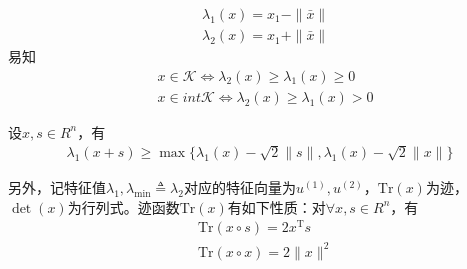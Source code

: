          \begin{align*}
        & {\lambda}_{1}(x)=x_1-\|\bar{x}\|\\
        & {\lambda}_{2}(x)=x_1+\|\bar{x}\|
        \end{align*}
        易知
         \begin{align*}
        & x \in \mathcal{K} \Leftrightarrow {\lambda}_{2}(x)\geqslant  {\lambda}_{1}(x)\geqslant 0\\
        & x \in int{}\mathcal{K} \Leftrightarrow {\lambda}_{2}(x)\geqslant {\lambda}_{1}(x) > 0
        \end{align*}
        \begin{lemma}
        设$x,s \in R^n$，有
         \begin{align*}
         {\lambda}_{1}(x+s) \geqslant {\max}\{{\lambda}_{1}(x)-\sqrt{2}\|s\|,{\lambda}_{1}(x)-\sqrt{2}\|x\|\}
        \end{align*}
        \end{lemma}
        \par
        另外，记特征值${\lambda}_1,{\lambda}_{\min} \triangleq {\lambda}_2$对应的特征向量为$u^{(1)},u^{(2)}$，$\mathrm{Tr}(x)$为迹，$\det(x)$为行列式。迹函数$\mathrm{Tr}(x)$有如下性质：对$\forall x,s \in R^n$，有
         \begin{align*}
         & \mathrm{Tr}(x\circ s)=2x^\mathrm{T} s\\
         & \mathrm{Tr}(x\circ x)=2\|x\|^2
        \end{align*}

